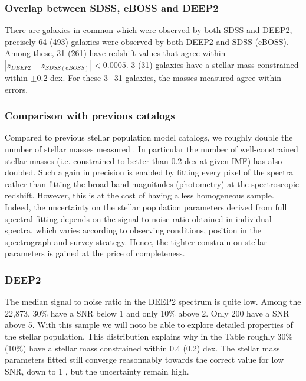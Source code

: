 \documentclass[onecolumn]{aa}
\newcommand{\OII}{$\left[\mathrm{O\textrm{\textsc{ii}}}\right]$\xspace}
\begin{document}
\subsubsection{Overlap between SDSS, eBOSS and DEEP2}
There are galaxies in common which were observed by both SDSS and DEEP2, precisely 64 (493) galaxies were observed by both DEEP2 and SDSS (eBOSS). 
Among these, 31 (261) have redshift values that agree within $|z_{DEEP2}-z_{SDSS (eBOSS)}|<0.0005$. 
3 (31) galaxies have a stellar mass constrained within $\pm0.2$ dex. 
For these 3+31 galaxies, the masses measured agree within errors. 
  
\subsubsection{Comparison with previous catalogs}
Compared to previous stellar population model catalogs, we roughly double the number of stellar masses measured \citep[DR12,][]{Maraston2013,Thomas2013a}. %
In particular the number of well-constrained stellar masses (i.e. constrained to better than 0.2 dex at given IMF) has also doubled. 
Such a gain in precision is enabled by fitting every pixel of the spectra rather than fitting the broad-band magnitudes (photometry) at the spectroscopic redshift. 
However, this is at the cost of having a less homogeneous sample. 
Indeed, the uncertainty on the stellar population parameters derived from full spectral fitting depends on the signal to noise ratio obtained in individual spectra, which varies according to observing conditions, position in the spectrograph and survey strategy. 
Hence, the tighter constrain on stellar parameters is gained at the price of completeness. 

\subsubsection{DEEP2}

The median signal to noise ratio in the DEEP2 spectrum is quite low. Among the 22,873, 30\% have a SNR below 1 and only 10\% above 2. Only 200 have a SNR above 5. With this sample we will noto be able to explore detailed properties of the stellar population. 
This distribution explains why in the Table roughly 30\% (10\%) have a stellar mass constrained within 0.4 (0.2) dex. 
The stellar mass parameters fitted still converge reasonnably towards the correct value for low SNR, down to 1 \citep{firefly2017MNRAS}, but the uncertainty remain high. 
  
\end{document}
